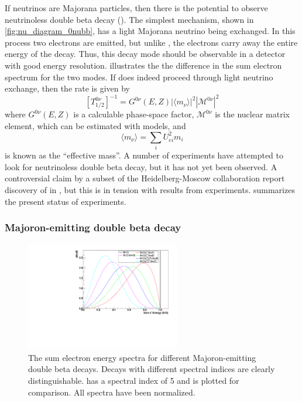 \documentclass[herrin-thesis.tex]{subfiles}
\begin{document}
If neutrinos are Majorana particles, then there is the potential to observe neutrinoless double beta decay (\zeronu{}). The simplest mechanism, shown in \cref{fig:nu_diagram_0nubb}, has a light Majorana neutrino being exchanged. In this process two electrons are emitted, but unlike \twonu{}, the electrons carry away the entire energy of the decay. Thus, this decay mode should be observable in a detector with good energy resolution.  illustrates the the difference in the sum electron spectrum for the two modes. If \zeronu{} does indeed proceed through light neutrino exchange, then the rate is given by
\begin{equation}
\left [ T^{0\nu}_{1/2} \right ]^{-1} = G^{0\nu}\left(E, Z\right)\left | \langle m_{\nu} \rangle \right |^2\left | \mathcal{M}^{0\nu}\right |^2
\label{eq:nu_zeronu_rate}
\end{equation}
where \(G^{0\nu}(E,Z)\) is a calculable phase-space factor, \( \mathcal{M}^{0\nu}\) is the nuclear matrix element, which can be estimated with models, and
\begin{equation}
\langle m_{\nu} \rangle = \sum_i U_{e i}^2 m_i
\label{eq:nu_meff_def}
\end{equation}
is known as the ``effective mass''. A number of experiments have attempted to look for neutrinoless double beta decay, but it has not yet been observed. A controversial claim by a subset of the Heidelberg-Moscow collaboration report discovery of \zeronu{} in \cite{KlapdorKleingrothaus:2006ff}, but this is in tension with results from  experiments\cite{Auger:2012ar}\cite{Gando:2013fk}.  summarizes the present status of experiments.

\subsubsection{Majoron-emitting double beta decay}

\begin{figure}[tbp]
	\centering
	\includegraphics[width=0.6\textwidth]{./plots/nu_majoron_spectra}
	\caption[Spectra for Majoron-emitting double beta decay modes]{The sum electron energy spectra for different Majoron-emitting double beta decays. Decays with different spectral indices are clearly distinguishable. \twonu{} has a spectral index of 5 and is plotted for comparison. All spectra have been normalized.}
	\label{fig:nu_majoron_spectra}
\end{figure}
\end{document}
